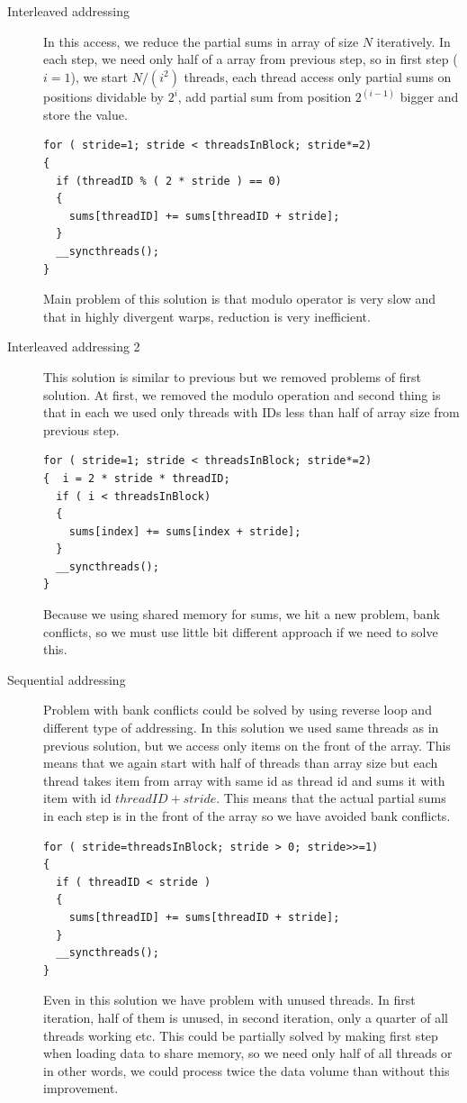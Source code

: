 \begin{description}
\item[Interleaved addressing] In this access, we reduce the partial sums in array of size $N$ iteratively. In each step, we need only half of a array from previous step, so in first step ($i=1$), we start $N/(i^2)$ threads, each thread access only partial sums on positions dividable by $2^i$, add partial sum from position $2^{(i-1)}$ bigger and store the value.
\begin{lstlisting}
for ( stride=1; stride < threadsInBlock; stride*=2)
{
  if (threadID % ( 2 * stride ) == 0)
  {
    sums[threadID] += sums[threadID + stride];
  }
  __syncthreads();
}
\end{lstlisting}
Main problem of this solution is that modulo operator is very slow and that in highly divergent warps, reduction is very inefficient.
\item[Interleaved addressing 2]This solution is similar to previous but we removed problems of first solution. At first, we removed the modulo operation and second thing is that in each we used only threads with IDs less than half of array size from previous step. 
\begin{lstlisting}
for ( stride=1; stride < threadsInBlock; stride*=2)
{  i = 2 * stride * threadID;
  if ( i < threadsInBlock)
  {
    sums[index] += sums[index + stride];
  }
  __syncthreads();
}
\end{lstlisting}
Because we using shared memory for sums, we hit a new problem, bank conflicts, so we must use little bit different approach if we need to solve this.
\item[Sequential addressing]Problem with bank conflicts could be solved by using reverse loop and different type of addressing. In this solution we used same threads as in previous solution, but we access only items on the front of the array. This means that we again start with half of threads than array size but each thread takes item from array with same id as thread id and sums it with item with id $threadID + stride$. This means that the actual partial sums in each step is in the front of the array so we have avoided bank conflicts.
\begin{lstlisting}
for ( stride=threadsInBlock; stride > 0; stride>>=1)
{
  if ( threadID < stride )
  {
    sums[threadID] += sums[threadID + stride];
  }
  __syncthreads();
}
\end{lstlisting}
Even in this solution we have problem with unused threads. In first iteration, half of them is unused, in second iteration, only a quarter of all threads working etc. This could be partially solved by making first step when loading data to share memory, so we need only half of all threads or in other words, we could process twice the data volume than without this improvement.

\end{description}
